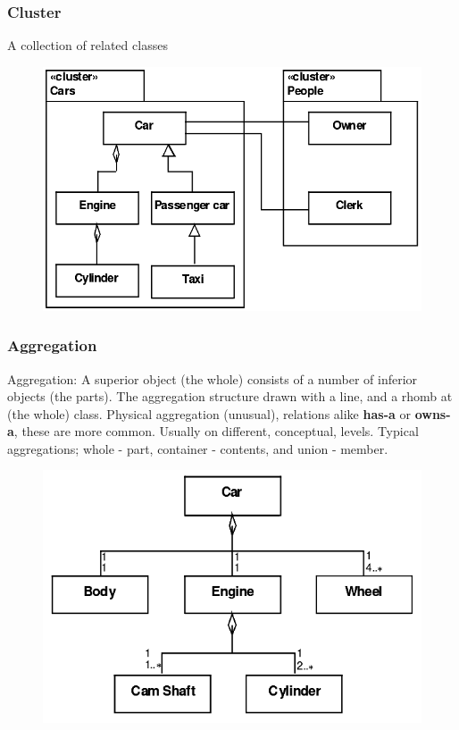 \subsubsection{Cluster}
A collection of related classes
\begin{figure}[H]
    \centering
    \includegraphics[scale=1.5]{figures/cluster.png}
\end{figure}

\subsubsection{Aggregation}
Aggregation: A superior object (the whole) consists of a number of inferior objects (the parts). The aggregation structure drawn with a line, and a rhomb at (the whole) class.
Physical aggregation (unusual), relations alike \textbf{has-a} or \textbf{owns-a}, these are more common. Usually on different, conceptual, levels. Typical aggregations; whole - part, container - contents, and union - member.

\begin{figure}[H]
    \centering
    \includegraphics[scale=1.5]{figures/aggregation.png}
\end{figure}

